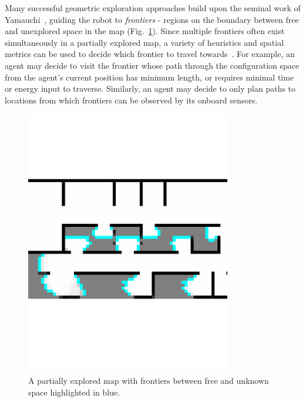 Many successful geometric exploration approaches build upon the seminal work of
Yamauchi~\cite{yamauchi1997frontier}, guiding the robot to \textit{frontiers} - regions on the boundary
between free and unexplored space in the map (Fig.~\ref{fig:frontiers}).
Since multiple frontiers often exist simultaneously in a partially explored map, a
variety of heuristics and spatial metrics can be used to decide which frontier to
travel towards~\cite{lavalle2006planning}. For example, an agent may decide to
visit the frontier whose path through the configuration space from the agent's current
position has minimum length, or requires minimal time or energy input to
traverse. Similarly, an agent may decide to only plan paths to locations
from which frontiers can be observed by its onboard sensors.

\begin{figure}[t]
  \centering
  \includegraphics[trim=0cm 0.4cm 0.1cm 0.1cm, clip, width=0.8\textwidth]{frontiers.pdf}
  \caption{A partially explored map with frontiers between free and unknown
  space highlighted in blue.\label{fig:frontiers}}
\end{figure}

